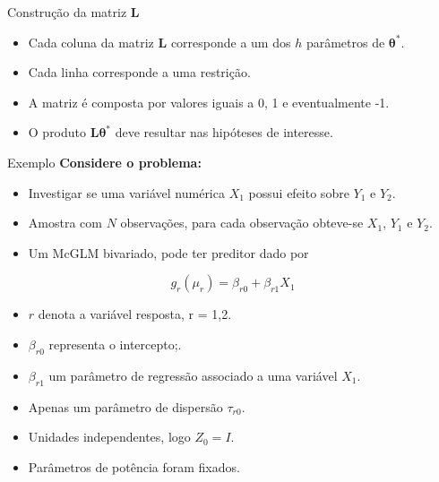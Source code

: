 \documentclass[
  ignorenonframetext,
  serif,
  professionalfont,
  usenames,
  dvipsnames,
  aspectratio = 169]{beamer}
\def\endColumns{\end{minipage}}%
\def\beginAHalfColumnT{\begin{minipage}[t]{0.49\textwidth}}%
\begin{document}
\begin{frame}{Construção da matriz \(\boldsymbol{L}\)}
\protect\hypertarget{construuxe7uxe3o-da-matriz-boldsymboll}{}
\begin{itemize}
  \itemsep 2ex
  
  \item Cada coluna da matriz $\boldsymbol{L}$ corresponde a um dos $h$ parâmetros de $\boldsymbol{\theta^{*}}$. 
  
  \item Cada linha corresponde a uma restrição. 

  \item A matriz é composta por valores iguais a 0, 1 e eventualmente -1.
  
  \item O produto $\boldsymbol{L}\boldsymbol{\theta^{*}}$ deve resultar nas hipóteses de interesse.

\end{itemize}
\end{frame}

\begin{frame}{Exemplo}
\protect\hypertarget{exemplo}{}
\textbf{Considere o problema:}

\begin{itemize}
  
  \item Investigar se uma variável numérica $X_1$ possui efeito sobre $Y_1$ e $Y_2$. 
  
  \item Amostra com $N$ observações, para cada observação obteve-se $X_1$, $Y_1$ e $Y_2$.

  \item Um McGLM bivariado, pode ter preditor dado por

\end{itemize}

\[
g_r(\mu_r) = \beta_{r0} + \beta_{r1} X_1
\]

\beginAHalfColumnT
  \begin{itemize}
    \itemsep 1ex
    \item $r$ denota a variável resposta, r = 1,2.
    \item $\beta_{r0}$ representa o intercepto;.
    \item $\beta_{r1}$ um parâmetro de regressão associado a uma variável $X_1$. 
  \end{itemize}  
\endColumns
\beginAHalfColumnT

\begin{itemize}
    \itemsep 1ex
    \item Apenas um parâmetro de dispersão $\tau_{r0}$.
    \item Unidades independentes, logo $Z_0 = I$.
    \item Parâmetros de potência foram fixados.
  \end{itemize}

\endColumns
\end{frame}
\end{document}
